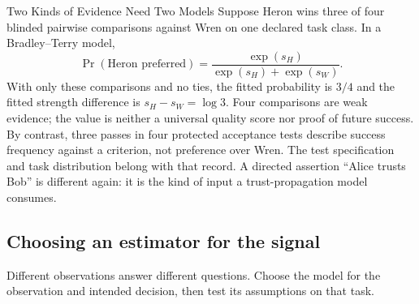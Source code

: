 \documentclass[11pt,a4paper]{article}
\theoremstyle{definition}
\begin{document}
\begin{pdexample}{Two Kinds of Evidence Need Two Models}
Suppose Heron wins three of four blinded pairwise comparisons against Wren on one declared task class. In a Bradley--Terry model,
\[
\Pr(\text{Heron preferred})=\frac{\exp(s_H)}{\exp(s_H)+\exp(s_W)}.
\]
With only these comparisons and no ties, the fitted probability is $3/4$ and the fitted strength difference is $s_H-s_W=\log 3$. Four comparisons are weak evidence; the value is neither a universal quality score nor proof of future success. By contrast, three passes in four protected acceptance tests describe success frequency against a criterion, not preference over Wren. The test specification and task distribution belong with that record. A directed assertion ``Alice trusts Bob'' is different again: it is the kind of input a trust-propagation model consumes.
\end{pdexample}

\subsection{Choosing an estimator for the signal}

Different observations answer different questions. Choose the model for the
observation and intended decision, then test its assumptions on that task.
\end{document}
